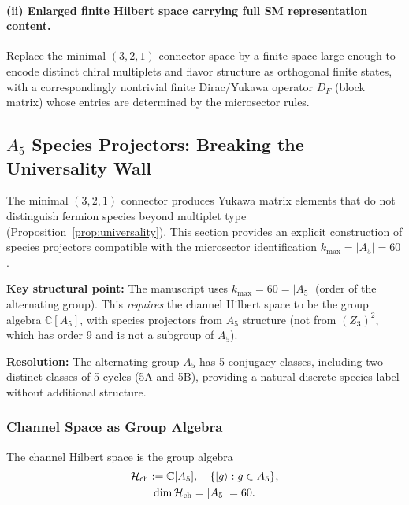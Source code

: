 \paragraph{(ii) Enlarged finite Hilbert space carrying full SM representation content.}
Replace the minimal $(3,2,1)$ connector space by a finite space large enough to encode
distinct chiral multiplets and flavor structure as orthogonal finite states, with a correspondingly 
nontrivial finite Dirac/Yukawa operator $D_F$ (block matrix) whose entries are determined by the 
microsector rules.

\subsection{$A_5$ Species Projectors: Breaking the Universality Wall}
\label{app:species_projectors_A5}

The minimal $(3,2,1)$ connector produces Yukawa matrix elements that do not 
distinguish fermion species beyond multiplet type (Proposition~\ref{prop:universality}).
This section provides an explicit construction of species projectors 
compatible with the microsector identification $k_{\max} = |A_5| = 60$.

\textbf{Key structural point:} The manuscript uses $k_{\max} = 60 = |A_5|$ 
(order of the alternating group). This \emph{requires} the channel Hilbert space 
to be the group algebra $\mathbb{C}[A_5]$, with species projectors from $A_5$ 
structure (not from $(Z_3)^2$, which has order 9 and is not a subgroup of $A_5$).

\textbf{Resolution:} The alternating group $A_5$ has 5 conjugacy classes, 
including two distinct classes of 5-cycles (5A and 5B), providing a natural 
discrete species label without additional structure.

\subsubsection{Channel Space as Group Algebra}

The channel Hilbert space is the group algebra
\begin{equation}
\begin{gathered}
\mathcal{H}_{\rm ch} := \mathbb{C}[A_5], \quad \{|g\rangle : g \in A_5\}, \\
\dim \mathcal{H}_{\rm ch} = |A_5| = 60.
\end{gathered}
\end{equation}

